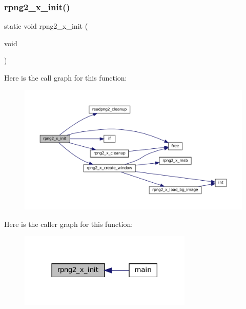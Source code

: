 \subsubsection{\texorpdfstring{rpng2\+\_\+x\+\_\+init()}{rpng2\_x\_init()}}
{\footnotesize\ttfamily static void rpng2\+\_\+x\+\_\+init (\begin{DoxyParamCaption}\item[{void}]{ }\end{DoxyParamCaption})\hspace{0.3cm}{\ttfamily [static]}}

Here is the call graph for this function\+:
\nopagebreak
\begin{figure}[H]
\begin{center}
\leavevmode
\includegraphics[width=350pt]{rpng2-x_8c_ab20ab6bc14c0853af2e0e7698125174e_cgraph}
\end{center}
\end{figure}
Here is the caller graph for this function\+:
\nopagebreak
\begin{figure}[H]
\begin{center}
\leavevmode
\includegraphics[width=234pt]{rpng2-x_8c_ab20ab6bc14c0853af2e0e7698125174e_icgraph}
\end{center}
\end{figure}
\mbox{\label{rpng2-x_8c_ad02636450f027c837e6a3fbbe7a81829}} 
